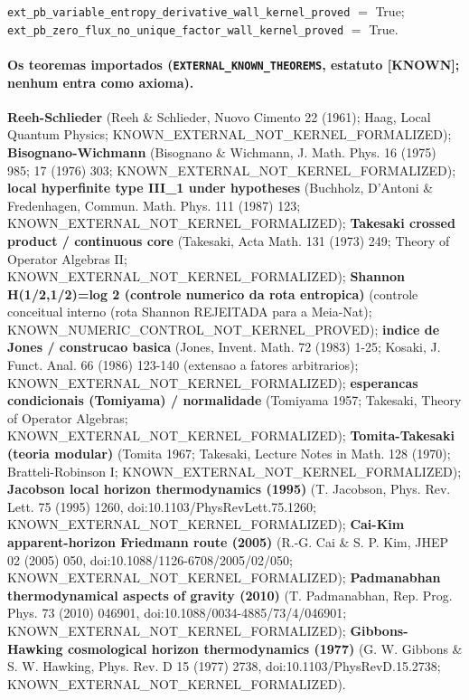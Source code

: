 \documentclass[11pt]{article}
\theoremstyle{definition}\newtheorem{deriv}{Derivação}
\begin{document}
\texttt{ext\_pb\_variable\_entropy\_derivative\_wall\_kernel\_proved} $=$ True; \texttt{ext\_pb\_zero\_flux\_no\_unique\_factor\_wall\_kernel\_proved} $=$ True.

\paragraph*{Os teoremas importados (\texttt{EXTERNAL\_KNOWN\_THEOREMS}, estatuto [KNOWN]; nenhum entra como axioma).} \textbf{Reeh-Schlieder} (Reeh \& Schlieder, Nuovo Cimento 22 (1961); Haag, Local Quantum Physics; KNOWN\_EXTERNAL\_NOT\_KERNEL\_FORMALIZED); \textbf{Bisognano-Wichmann} (Bisognano \& Wichmann, J. Math. Phys. 16 (1975) 985; 17 (1976) 303; KNOWN\_EXTERNAL\_NOT\_KERNEL\_FORMALIZED); \textbf{local hyperfinite type III\_1 under hypotheses} (Buchholz, D'Antoni \& Fredenhagen, Commun. Math. Phys. 111 (1987) 123; KNOWN\_EXTERNAL\_NOT\_KERNEL\_FORMALIZED); \textbf{Takesaki crossed product / continuous core} (Takesaki, Acta Math. 131 (1973) 249; Theory of Operator Algebras II; KNOWN\_EXTERNAL\_NOT\_KERNEL\_FORMALIZED); \textbf{Shannon H(1/2,1/2)=log 2 (controle numerico da rota entropica)} (controle conceitual interno (rota Shannon REJEITADA para a Meia-Nat); KNOWN\_NUMERIC\_CONTROL\_NOT\_KERNEL\_PROVED); \textbf{indice de Jones / construcao basica} (Jones, Invent. Math. 72 (1983) 1-25; Kosaki, J. Funct. Anal. 66 (1986) 123-140 (extensao a fatores arbitrarios); KNOWN\_EXTERNAL\_NOT\_KERNEL\_FORMALIZED); \textbf{esperancas condicionais (Tomiyama) / normalidade} (Tomiyama 1957; Takesaki, Theory of Operator Algebras; KNOWN\_EXTERNAL\_NOT\_KERNEL\_FORMALIZED); \textbf{Tomita-Takesaki (teoria modular)} (Tomita 1967; Takesaki, Lecture Notes in Math. 128 (1970); Bratteli-Robinson I; KNOWN\_EXTERNAL\_NOT\_KERNEL\_FORMALIZED); \textbf{Jacobson local horizon thermodynamics (1995)} (T. Jacobson, Phys. Rev. Lett. 75 (1995) 1260, doi:10.1103/PhysRevLett.75.1260; KNOWN\_EXTERNAL\_NOT\_KERNEL\_FORMALIZED); \textbf{Cai-Kim apparent-horizon Friedmann route (2005)} (R.-G. Cai \& S. P. Kim, JHEP 02 (2005) 050, doi:10.1088/1126-6708/2005/02/050; KNOWN\_EXTERNAL\_NOT\_KERNEL\_FORMALIZED); \textbf{Padmanabhan thermodynamical aspects of gravity (2010)} (T. Padmanabhan, Rep. Prog. Phys. 73 (2010) 046901, doi:10.1088/0034-4885/73/4/046901; KNOWN\_EXTERNAL\_NOT\_KERNEL\_FORMALIZED); \textbf{Gibbons-Hawking cosmological horizon thermodynamics (1977)} (G. W. Gibbons \& S. W. Hawking, Phys. Rev. D 15 (1977) 2738, doi:10.1103/PhysRevD.15.2738; KNOWN\_EXTERNAL\_NOT\_KERNEL\_FORMALIZED).
\end{document}

